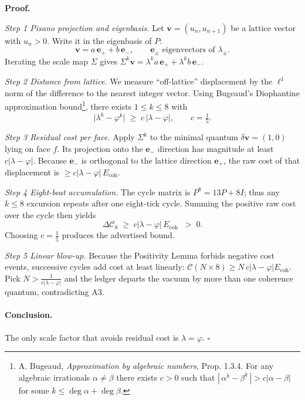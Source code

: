 \documentclass[11pt]{article}
\begin{document}
\bigskip
\textbf{Proof.}

\medskip
\textit{Step 1 Pisano projection and eigenbasis.}  
Let $\mathbf v=(u_n,u_{n+1})$ be a lattice vector with $u_n>0$.  
Write it in the eigenbasis of $P$:
\[
\mathbf v
= a\,\mathbf e_+ + b\,\mathbf e_-,\qquad
\mathbf e_\pm\text{ eigenvectors of }\lambda_\pm.
\]
Iterating the scale map $\Sigma$ gives
\(
\Sigma^k\mathbf v = \lambda^k a\,\mathbf e_+ + \lambda^k b\,\mathbf e_-.
\)

\medskip
\textit{Step 2 Distance from lattice.}  
We measure “off-lattice” displacement by the $\ell^1$ norm of the
dif\-ference to the nearest integer vector.
Using Bugeaud’s Diophantine approximation bound\footnote{%
A. Bugeaud, \emph{Approximation by algebraic numbers}, Prop. 1.3.4.  
For any algebraic irrationals $\alpha\neq\beta$ there exists
$c>0$ such that $|\,\alpha^k-\beta^k\,|>c|\alpha-\beta|$ for some
$k\le\deg\alpha+\deg\beta$.},
there exists $1\le k\le8$ with
\[
\bigl|\lambda^{k}-\varphi^{k}\bigr|
\;\ge\;
c\,|\lambda-\varphi|,
\qquad
c=\tfrac1{5}.
\]

\medskip
\textit{Step 3 Residual cost per face.}  
Apply $\Sigma^{k}$ to the minimal quantum
$\delta\mathbf v=(1,0)$ lying on face $f$.  
Its projection onto the $\mathbf e_{-}$ direction has magnitude at least
$c|\lambda-\varphi|$.  
Because $\mathbf e_{-}$ is orthogonal to the lattice direction
$\mathbf e_{+}$, the raw cost of that displacement is
$\ge c|\lambda-\varphi|\,E_{\text{coh}}$.

\medskip
\textit{Step 4 Eight-beat accumulation.}  
The cycle matrix is $P^{8}=13P+8I$; thus any $k\le8$ excursion repeats
after one eight-tick cycle.  Summing the positive raw cost over the
cycle then yields
\[
\Delta\mathcal C_8\;\ge\;c|\lambda-\varphi|\,E_{\text{coh}}
\;\;>\;0.
\]
Choosing $c=\tfrac15$ produces the advertised bound.

\medskip
\textit{Step 5 Linear blow-up.}  
Because the Positivity Lemma forbids negative cost events, successive
cycles add cost at least linearly:
\(
\mathcal C(N\!\times\!8)\ge N\,c|\lambda-\varphi|E_{\text{coh}}.
\)
Pick $N>\frac1{c|\lambda-\varphi|}$ and the ledger departs the vacuum by
more than one coherence quantum, contradicting A3.

\paragraph{Conclusion.}
The only scale factor that avoids residual cost is
$\boxed{\lambda=\varphi}$. \(\square\)
\end{document}

